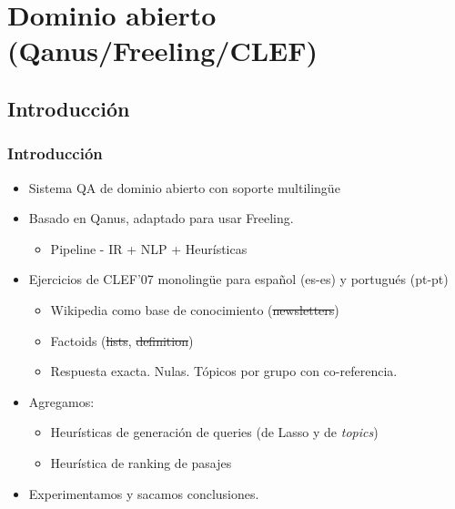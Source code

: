 \fontsize{9.5pt}{7.2}\selectfont

\section{Dominio abierto (Qanus/Freeling/CLEF)}

\subsection{Introducción}

\begin{frame}[<+->]
\frametitle{Introducción}
  \begin{itemize}
    \item Sistema QA de dominio abierto con soporte multilingüe
    \item Basado en Qanus, adaptado para usar Freeling.
    \begin{itemize}
      \item Pipeline - IR + NLP + Heurísticas
    \end{itemize}
    \item Ejercicios de CLEF'07 monolingüe para español (es-es) y portugués (pt-pt)
    \begin{itemize}
      \item Wikipedia como base de conocimiento (\st{newsletters})
      \item Factoids (\st{lists}, \st{definition})
      \item Respuesta exacta. Nulas. Tópicos por grupo con co-referencia.
    \end{itemize}
    \item Agregamos: 
    \begin{itemize}
        \item Heurísticas de generación de queries (de Lasso y de \textit{topics})
        \item Heurística de ranking de pasajes
    \end{itemize}
    \item Experimentamos y sacamos conclusiones.
  \end{itemize}


\end{frame}




